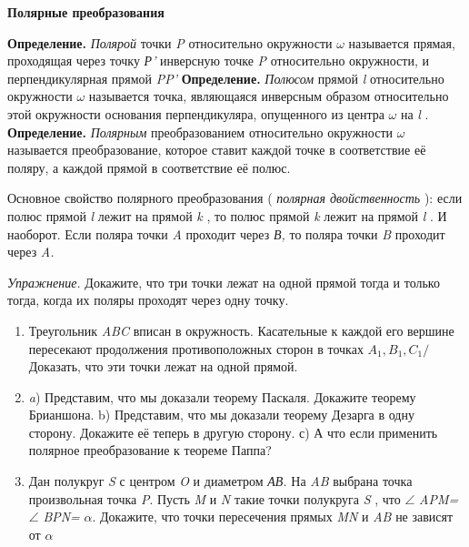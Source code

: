 \documentclass[a4paper, 12pt]{article}
\begin{document}
\begin{center}
	\Large{\textbf{Полярные преобразования}}
\end{center}

{\bfseries{Определение.}}
{\itshape{Полярой}}
точки
{\itshape{P}}
относительно окружности
$\omega$
называется прямая, проходящая через точку
{\itshape{Р'}}
инверсную точке
{\itshape{P}}
относительно окружности, и перпендикулярная прямой
{\itshape{PP'}}
{\bfseries{Определение.}}
{\itshape{Полюсом}}
прямой
{\itshape{l}}
относительно окружности
$\omega$
называется точка, являющаяся инверсным образом относительно этой окружности основания перпендикуляра, опущенного из центра
$\omega$
на
{\itshape{l}}
.
{\bfseries{Определение.}}
{\itshape{Полярным}}
преобразованием относительно окружности
$\omega$
называется преобразование, которое ставит каждой точке в соответствие её поляру, а каждой прямой в соответствие её полюс.

Основное свойство полярного преобразования (
{\itshape{полярная двойственность}}
): если полюс прямой
{\itshape{l}}
лежит на прямой
{\itshape{k}}
, то полюс прямой
{\itshape{k}}
лежит на прямой 
{\itshape{l}}
. И наоборот. Если поляра точки
{\itshape{A}}
проходит через
{\itshape{В,}}
то поляра точки
{\itshape{B}}
проходит через
{\itshape{A.}}

{\itshape{Упражнение.}}
Докажите, что три точки лежат на одной прямой тогда и только тогда, когда их поляры проходят через одну точку.
\begin{enumerate}
	\item{Треугольник}
{\itshape{ABC}}
вписан в окружность. Касательные к каждой его вершине пересекают продолжения противоположных сторон в точках
{\itshape{$A_1, B_1, C_1/$}}Доказать, что эти точки лежат на одной прямой.

\item{}
{\itshape{a}})
Представим, что мы доказали теорему Паскаля. Докажите теорему Брианшона.
b) Представим, что мы доказали теорему Дезарга в одну сторону. Докажите её теперь в другую сторону. с) А что если применить полярное преобразование к теореме Паппа?
\item{Дан полукруг}
{\itshape{S}}
с центром
{\itshape{O}}
и диаметром
{\itshape{АВ.}}
На
{\itshape{AB}}
выбрана точка произвольная точка
{\itshape{P}}.
Пусть
{\itshape{M}}
и
{\itshape{N}}
такие точки полукруга
{\itshape{S}}
, что 
$\angle$
{\itshape{APM=}}
$\angle$
{\itshape{BPN=}}
$\alpha$.
Докажите, что точки пересечения прямых
{\itshape{MN}}
и
{\itshape{AB}}
не зависят от
$\alpha$
\end{enumerate}
\end{document}

